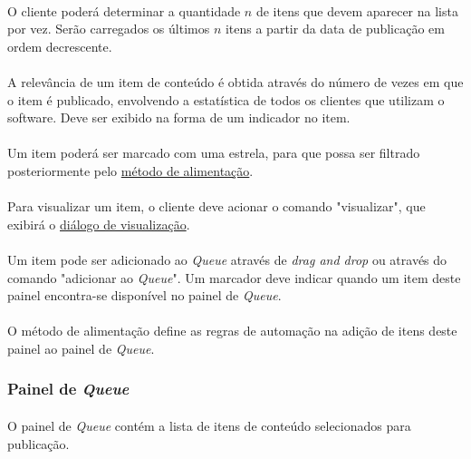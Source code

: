 \documentclass[a4paper,12pt]{article}
\def\queue{\emph{Queue}}
\def\dragndrop{\emph{drag and drop}}
\def\dialogovisualizacao{\hyperref[dialogovisualizacao]{diálogo de visualização}}
\def\metodoalimentacao{\hyperref[metodoalimentacao]{método de alimentação}}
\begin{document}
\paragraph{}
O cliente poderá determinar a quantidade $n$ de itens que devem aparecer na
lista por vez. Serão carregados os últimos $n$ itens a partir da data de
publicação em ordem decrescente.

\paragraph{}
A relevância de um item de conteúdo é obtida através do número de vezes em que
o item é publicado, envolvendo a estatística de todos os clientes que utilizam
o software. Deve ser exibido na forma de um indicador no item.

\paragraph{}
Um item poderá ser marcado com uma estrela, para que possa ser filtrado
posteriormente pelo \metodoalimentacao{}.

\paragraph{}
Para visualizar um item, o cliente deve acionar o comando "visualizar", que
exibirá o \dialogovisualizacao{}.

\paragraph{}
Um item pode ser adicionado ao \queue{} através de \dragndrop{} ou através do
comando "adicionar ao \queue{}". Um marcador deve indicar quando um item deste
painel encontra-se disponível no painel de \queue{}.

\paragraph{}
O método de alimentação define as regras de automação na adição de itens deste
painel ao painel de \queue{}.

\subsubsection{Painel de \queue{}}

\paragraph{}
O painel de \queue{} contém a lista de itens de conteúdo selecionados para
publicação.
\end{document}
